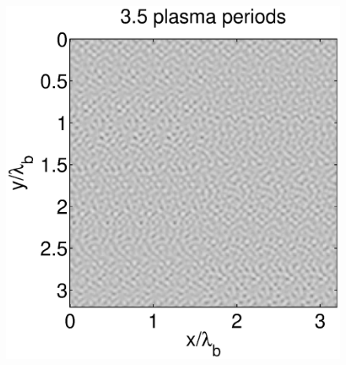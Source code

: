 \documentclass[conference]{IEEEtran}
\renewcommand{\~}{\widetilde }
\begin{document}
\begin{figure}[H]
\begin{center}
	\begin{minipage}{0.40\columnwidth}
		\begin{center}
			\includegraphics[width=1.0\columnwidth]{m3_5_PIC.eps}
		\end{center}
	\end{minipage}%
	\begin{minipage}{0.40\columnwidth}

\end{minipage}
\end{center}
\end{figure}
\end{document}
